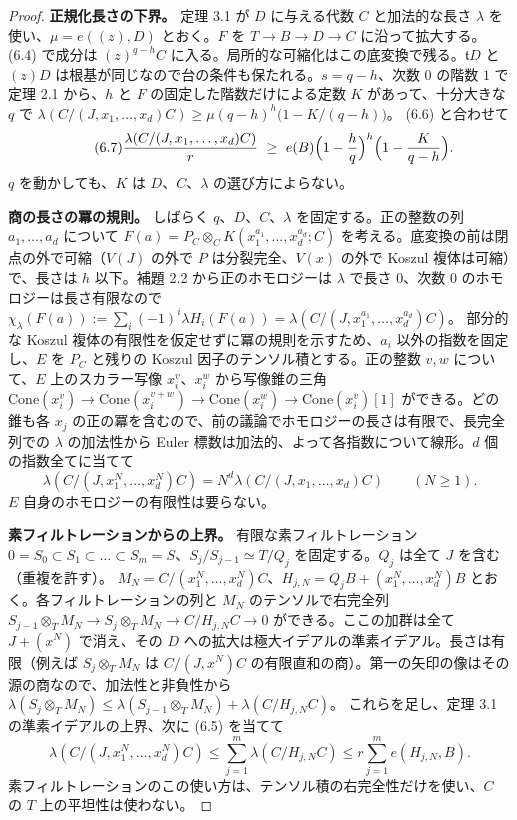 \documentclass[11pt,a4paper]{ltjsarticle}
\theoremstyle{plain}
\theoremstyle{definition}
\newcommand{\tf}{\mathfrak{t}}
\begin{document}
\begin{proof}
\textbf{正規化長さの下界。} 定理 3.1 が $D$ に与える代数 $C$ と加法的な長さ $\lambda$ を使い、$\mu = e((z),D)$ とおく。$F$ を $T\to B\to D\to C$ に沿って拡大する。(6.4) で成分は $(z)^{q-h}C$ に入る。局所的な可縮化はこの底変換で残る。$\tf D$ と $(z)D$ は根基が同じなので台の条件も保たれる。$s = q-h$、次数 $0$ の階数 $1$ で定理 2.1 から、$h$ と $F$ の固定した階数だけによる定数 $K$ があって、十分大きな $q$ で
$\lambda(C/(J,x_1,\dots,x_d)C)\ge\mu(q-h)^h\bigl(1-K/(q-h)\bigr)$。
(6.6) と合わせて
\begin{equation}\tag{6.7}
  \frac{\lambda(C/(J,x_1,\dots,x_d)C)}{r}\ \ge\ e(B)\Bigl(1-\frac hq\Bigr)^h\Bigl(1-\frac K{q-h}\Bigr).
\end{equation}
$q$ を動かしても、$K$ は $D$、$C$、$\lambda$ の選び方によらない。

\textbf{商の長さの冪の規則。} しばらく $q$、$D$、$C$、$\lambda$ を固定する。正の整数の列 $a_1,\dots,a_d$ について $F(a) = P_C\otimes_CK(x_1^{a_1},\dots,x_d^{a_d};C)$ を考える。底変換の前は閉点の外で可縮（$V(J)$ の外で $P$ は分裂完全、$V(x)$ の外で Koszul 複体は可縮）で、長さは $h$ 以下。補題 2.2 から正のホモロジーは $\lambda$ で長さ $0$、次数 $0$ のホモロジーは長さ有限なので
$\chi_\lambda(F(a)) := \sum_i(-1)^i\lambda H_i(F(a)) = \lambda(C/(J,x_1^{a_1},\dots,x_d^{a_d})C)$。
部分的な Koszul 複体の有限性を仮定せずに冪の規則を示すため、$a_i$ 以外の指数を固定し、$E$ を $P_C$ と残りの Koszul 因子のテンソル積とする。正の整数 $v,w$ について、$E$ 上のスカラー写像 $x_i^v$、$x_i^w$ から写像錐の三角
$\mathrm{Cone}(x_i^v)\to\mathrm{Cone}(x_i^{v+w})\to\mathrm{Cone}(x_i^w)\to\mathrm{Cone}(x_i^v)[1]$
ができる。どの錐も各 $x_j$ の正の冪を含むので、前の議論でホモロジーの長さは有限で、長完全列での $\lambda$ の加法性から Euler 標数は加法的、よって各指数について線形。$d$ 個の指数全てに当てて
\begin{equation}\tag{6.8}
  \lambda(C/(J,x_1^N,\dots,x_d^N)C) = N^d\lambda(C/(J,x_1,\dots,x_d)C)\qquad(N\ge1).
\end{equation}
$E$ 自身のホモロジーの有限性は要らない。

\textbf{素フィルトレーションからの上界。} 有限な素フィルトレーション $0 = S_0\subset S_1\subset\dots\subset S_m = S$、$S_j/S_{j-1}\simeq T/Q_j$ を固定する。$Q_j$ は全て $J$ を含む（重複を許す）。
$M_N = C/(x_1^N,\dots,x_d^N)C$、$H_{j,N} = Q_jB+(x_1^N,\dots,x_d^N)B$
とおく。各フィルトレーションの列と $M_N$ のテンソルで右完全列
$S_{j-1}\otimes_TM_N\to S_j\otimes_TM_N\to C/H_{j,N}C\to0$
ができる。ここの加群は全て $J+(x^N)$ で消え、その $D$ への拡大は極大イデアルの準素イデアル。長さは有限（例えば $S_j\otimes_TM_N$ は $C/(J,x^N)C$ の有限直和の商）。第一の矢印の像はその源の商なので、加法性と非負性から
$\lambda(S_j\otimes_TM_N)\le\lambda(S_{j-1}\otimes_TM_N)+\lambda(C/H_{j,N}C)$。
これらを足し、定理 3.1 の準素イデアルの上界、次に (6.5) を当てて
\begin{equation}\tag{6.9}
  \lambda(C/(J,x_1^N,\dots,x_d^N)C)\le\sum_{j=1}^m\lambda(C/H_{j,N}C)\le r\sum_{j=1}^me(H_{j,N},B).
\end{equation}
素フィルトレーションのこの使い方は、テンソル積の右完全性だけを使い、$C$ の $T$ 上の平坦性は使わない。


\end{proof}
\end{document}
